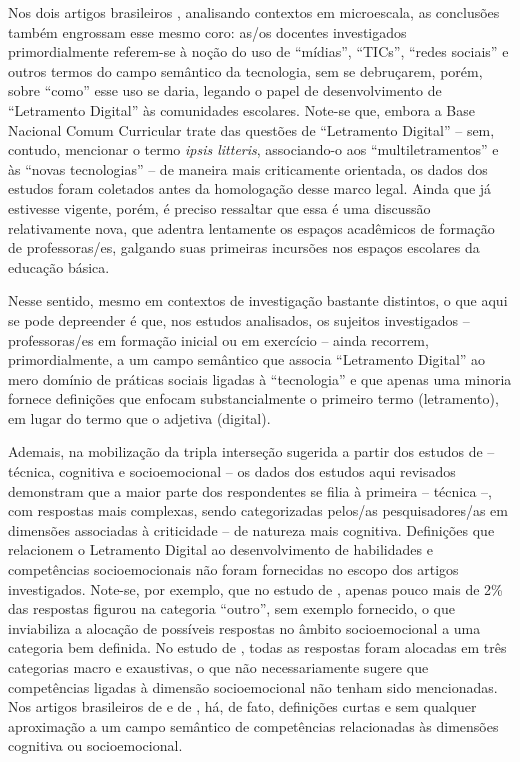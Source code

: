 \documentclass[portuguese]{textolivre}
\begin{document}
Nos dois artigos brasileiros \cite{santos_o_2017,_santos_letramento_2018}, analisando contextos em microescala, as conclusões também engrossam esse mesmo coro: as/os docentes investigados primordialmente referem-se à noção do uso de “mídias”, “TICs”, “redes sociais” e outros termos do campo semântico da tecnologia, sem se debruçarem, porém, sobre “como” esse uso se daria, legando o papel de desenvolvimento de “Letramento Digital” às comunidades escolares. Note-se que, embora a Base Nacional Comum Curricular \cite{brasil_ministerio_2018} trate das questões de “Letramento Digital” – sem, contudo, mencionar o termo \textit{ipsis litteris}, associando-o aos “multiletramentos” e às “novas tecnologias” – de maneira mais criticamente orientada, os dados dos estudos foram coletados antes da homologação desse marco legal. Ainda que já estivesse vigente, porém, é preciso ressaltar que essa é uma discussão relativamente nova, que adentra lentamente os espaços acadêmicos de formação de professoras/es, galgando suas primeiras incursões nos espaços escolares da educação básica.

Nesse sentido, mesmo em contextos de investigação bastante distintos, o que aqui se pode depreender é que, nos estudos analisados, os sujeitos investigados – professoras/es em formação inicial ou em exercício – ainda recorrem, primordialmente, a um campo semântico que associa “Letramento Digital” ao mero domínio de práticas sociais ligadas à “tecnologia” e que apenas uma minoria fornece definições que enfocam substancialmente o primeiro termo (letramento), em lugar do termo que o adjetiva (digital).

Ademais, na mobilização da tripla interseção sugerida a partir dos estudos de \textcite{list_framework_2020} – técnica, cognitiva e socioemocional – os dados dos estudos aqui revisados demonstram que a maior parte dos respondentes se filia à primeira – técnica –, com respostas mais complexas, sendo categorizadas pelos/as pesquisadores/as em dimensões associadas à criticidade – de natureza mais cognitiva. Definições que relacionem o Letramento Digital ao desenvolvimento de habilidades e competências socioemocionais não foram fornecidas no escopo dos artigos investigados. Note-se, por exemplo, que no estudo de \textcite{list_framework_2020}, apenas pouco mais de 2\% das respostas figurou na categoria “outro”, sem exemplo fornecido, o que inviabiliza a alocação de possíveis respostas no âmbito socioemocional a uma categoria bem definida. No estudo de \textcite{nabhan_pre-service_2021}, todas as respostas foram alocadas em três categorias macro e exaustivas, o que não necessariamente sugere que competências ligadas à dimensão socioemocional não tenham sido mencionadas. Nos artigos brasileiros de \textcite{santos_o_2017} e de \textcite{_santos_letramento_2018}, há, de fato, definições curtas e sem qualquer aproximação a um campo semântico de competências relacionadas às dimensões cognitiva ou socioemocional.
\end{document}
